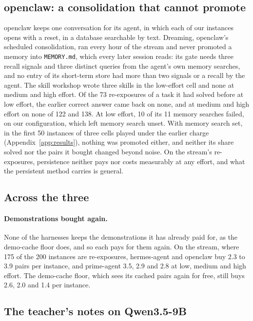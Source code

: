 \subsection{openclaw: a consolidation that cannot promote}
\label{app:persist-openclaw}

openclaw keeps one conversation for its agent, in which each of our instances opens with a reset, in a database searchable by text. Dreaming, openclaw's scheduled consolidation, ran every hour of the stream and never promoted a memory into \texttt{MEMORY.md}, which every later session reads: its gate needs three recall signals and three distinct queries from the agent's own memory searches, and no entry of its short-term store had more than two signals or a recall by the agent. The skill workshop wrote three skills in the low-effort cell and none at medium and high effort. Of the 73 re-exposures of a task it had solved before at low effort, the earlier correct answer came back on none, and at medium and high effort on none of 122 and 138. At low effort, 10 of its 11 memory searches failed, on our configuration, which left memory search unset. With memory search set, in the first 50 instances of three cells played under the earlier charge (Appendix~\ref{app:results}), nothing was promoted either, and neither its share solved nor the pairs it bought changed beyond noise. On the stream's re-exposures, persistence neither pays nor costs measurably at any effort, and what the persistent method carries is general.

\subsection{Across the three}

\paragraph{Demonstrations bought again.}
None of the harnesses keeps the demonstrations it has already paid for, as the demo-cache floor does, and so each pays for them again. On the stream, where 175 of the 200 instances are re-exposures, hermes-agent and openclaw buy 2.3 to 3.9 pairs per instance, and prime-agent 3.5, 2.9 and 2.8 at low, medium and high effort. The demo-cache floor, which sees its cached pairs again for free, still buys 2.6, 2.0 and 1.4 per instance.

\subsection{The teacher's notes on Qwen3.5-9B}
\label{app:persist-teacher}

